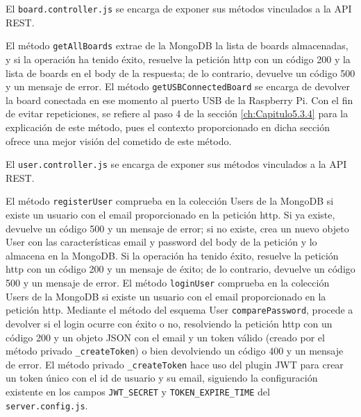 \vspace{1cm}

El \verb|board.controller.js| se encarga de exponer sus métodos vinculados a la API REST.

\vspace{0.5cm}

El método \verb|getAllBoards| extrae de la MongoDB la lista de boards almacenadas, y si la operación ha tenido éxito, resuelve la petición http con un código 200 y la lista de boards en el body de la respuesta; de lo contrario, devuelve un código 500 y un mensaje de error.
El método \verb|getUSBConnectedBoard| se encarga de devolver la board conectada en ese momento al puerto USB de la Raspberry Pi. Con el fin de evitar repeticiones, se refiere al paso 4 de la sección \ref{ch:Capitulo5.3.4} para la explicación de este método, pues el contexto proporcionado en dicha sección ofrece una mejor visión del cometido de este método.

\vspace{1cm}

El \verb|user.controller.js| se encarga de exponer sus métodos vinculados a la API REST.

\vspace{0.5cm}

El método \verb|registerUser| comprueba en la colección Users de la MongoDB si existe un usuario con el email proporcionado en la petición http. Si ya existe, devuelve un código 500 y un mensaje de error; si no existe, crea un nuevo objeto User con las características email y password del body de la petición y lo almacena en la MongoDB. Si la operación ha tenido éxito, resuelve la petición http con un código 200 y un mensaje de éxito; de lo contrario, devuelve un código 500 y un mensaje de error.
El método \verb|loginUser| comprueba en la colección Users de la MongoDB si existe un usuario con el email proporcionado en la petición http. Mediante el método del esquema User \verb|comparePassword|, procede a devolver si el login ocurre con éxito o no, resolviendo la petición http con un código 200 y un objeto JSON con el email y un token válido (creado por el método privado \verb|_createToken|) o bien devolviendo un código 400 y un mensaje de error.
El método privado \verb|_createToken| hace uso del plugin JWT para crear un token único con el id de usuario y su email, siguiendo la configuración existente en los campos \verb|JWT_SECRET| y \verb|TOKEN_EXPIRE_TIME| del \verb|server.config.js|.

\vspace{1cm}

